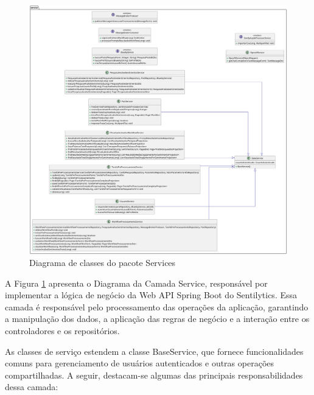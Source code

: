 \documentclass[
	12pt,				%
	oneside,			%
	a4paper,			%
	english,			%
	french,				%
	spanish,			%
	brazil				%
	]{abntex2}
\begin{document}
\begin{figure}[htbp]
\hypertarget{diagram_service}{%
\caption{Diagrama de classes do pacote Services}\label{diagram_service}
\begin{center}
\includegraphics[scale=0.2]{imagens/sentilytics/diagramas/classes/service-classes.png}
\end{center}
}
\end{figure}

A Figura \ref{diagram_service} apresenta o Diagrama da Camada Service,
responsável por implementar a lógica de negócio da Web API Spring Boot
do Sentilytics. Essa camada é responsável pelo processamento das
operações da aplicação, garantindo a manipulação dos dados, a aplicação
das regras de negócio e a interação entre os controladores e os
repositórios.

As classes de serviço estendem a classe BaseService, que fornece
funcionalidades comuns para gerenciamento de usuários autenticados e
outras operações compartilhadas. A seguir, destacam-se algumas das
principais responsabilidades dessa camada:
\end{document}
